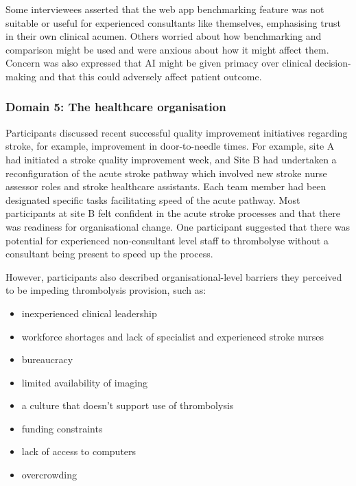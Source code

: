 Some interviewees asserted that the web app benchmarking feature was not suitable or useful for experienced consultants like themselves, emphasising trust in their own clinical acumen. Others worried about how benchmarking and comparison might be used and were anxious about how it might affect them. Concern was also expressed that AI might be given primacy over clinical decision-making and that this could adversely affect patient outcome.

\subsubsection{Domain 5: The healthcare organisation}

Participants discussed recent successful quality improvement initiatives regarding stroke, for example, improvement in door-to-needle times. For example, site A had initiated a stroke quality improvement week, and Site B had undertaken a reconfiguration of the acute stroke pathway which involved new stroke nurse assessor roles and stroke healthcare assistants. Each team member had been designated specific tasks facilitating speed of the acute pathway. Most participants at site B felt confident in the acute stroke processes and that there was readiness for organisational change. One participant suggested that there was potential for experienced non-consultant level staff to thrombolyse without a consultant being present to speed up the process.

However, participants also described organisational-level barriers they perceived to be impeding thrombolysis provision, such as:

\begin{itemize}
    \item inexperienced clinical leadership

    \item workforce shortages and lack of specialist and experienced stroke nurses

    \item bureaucracy

    \item limited availability of imaging

    \item a culture that doesn't support use of thrombolysis

    \item funding constraints

    \item lack of access to computers

    \item overcrowding

\end{itemize}

